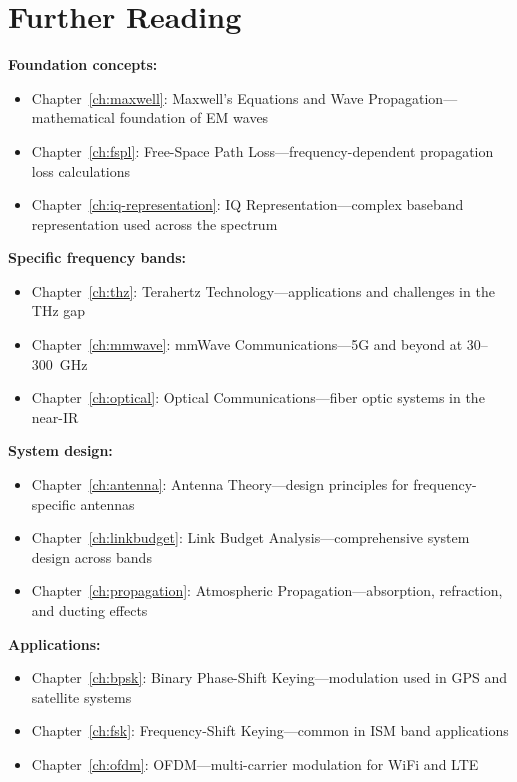 \section{Further Reading}

\textbf{Foundation concepts:}
\begin{itemize}
\item Chapter~\ref{ch:maxwell}: Maxwell's Equations and Wave Propagation---mathematical foundation of EM waves
\item Chapter~\ref{ch:fspl}: Free-Space Path Loss---frequency-dependent propagation loss calculations
\item Chapter~\ref{ch:iq-representation}: IQ Representation---complex baseband representation used across the spectrum
\end{itemize}

\textbf{Specific frequency bands:}
\begin{itemize}
\item Chapter~\ref{ch:thz}: Terahertz Technology---applications and challenges in the THz gap
\item Chapter~\ref{ch:mmwave}: mmWave Communications---5G and beyond at 30--300~GHz
\item Chapter~\ref{ch:optical}: Optical Communications---fiber optic systems in the near-IR
\end{itemize}

\textbf{System design:}
\begin{itemize}
\item Chapter~\ref{ch:antenna}: Antenna Theory---design principles for frequency-specific antennas
\item Chapter~\ref{ch:linkbudget}: Link Budget Analysis---comprehensive system design across bands
\item Chapter~\ref{ch:propagation}: Atmospheric Propagation---absorption, refraction, and ducting effects
\end{itemize}

\textbf{Applications:}
\begin{itemize}
\item Chapter~\ref{ch:bpsk}: Binary Phase-Shift Keying---modulation used in GPS and satellite systems
\item Chapter~\ref{ch:fsk}: Frequency-Shift Keying---common in ISM band applications
\item Chapter~\ref{ch:ofdm}: OFDM---multi-carrier modulation for WiFi and LTE
\end{itemize}
